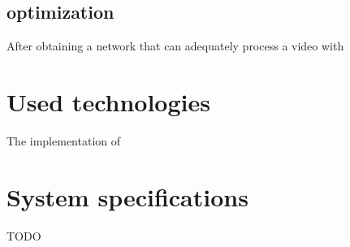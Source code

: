 \documentclass[12pt,openright,twoside,a4paper,english]{abntex2}
\begin{document}
\begin{otherlanguage}{english}
\subsection{optimization}
After obtaining a network that can adequately process a video with

\section{Used technologies}
The implementation of

\section{System specifications}
TODO



\end{otherlanguage}
\end{document}
